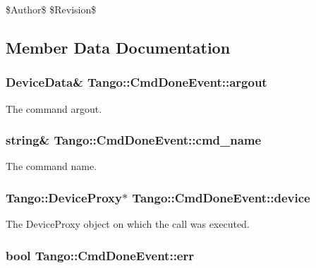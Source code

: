 \$\-Author\$ \$\-Revision\$ 

\subsection{Member Data Documentation}
\subsubsection[{argout}]{\setlength{\rightskip}{0pt plus 5cm}Device\-Data\& Tango\-::\-Cmd\-Done\-Event\-::argout}\label{classTango_1_1CmdDoneEvent_a5bfb13a2fa90db07a6bd6092188dd96b}


The command argout. 

\subsubsection[{cmd\-\_\-name}]{\setlength{\rightskip}{0pt plus 5cm}string\& Tango\-::\-Cmd\-Done\-Event\-::cmd\-\_\-name}\label{classTango_1_1CmdDoneEvent_a9b3ff5a65147c469b19d5deafecf600a}


The command name. 

\subsubsection[{device}]{\setlength{\rightskip}{0pt plus 5cm}Tango\-::\-Device\-Proxy$\ast$ Tango\-::\-Cmd\-Done\-Event\-::device}\label{classTango_1_1CmdDoneEvent_a4815622ebc52bc227f481e2d488cc7c1}


The Device\-Proxy object on which the call was executed. 

\subsubsection[{err}]{\setlength{\rightskip}{0pt plus 5cm}bool Tango\-::\-Cmd\-Done\-Event\-::err}\label{classTango_1_1CmdDoneEvent_aa65c091b8483025114f5825760cb994a}


